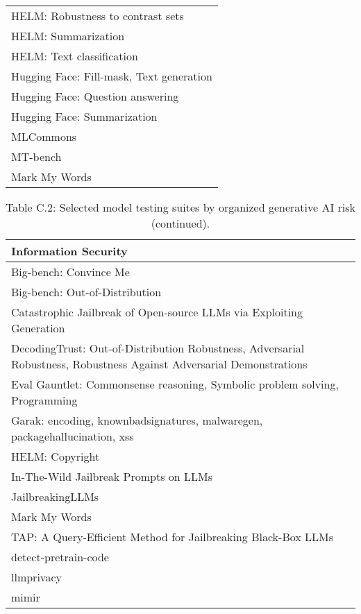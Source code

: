 \documentclass[fleqn]{article}
\begin{document}
\begin{table}[H]
\begin{tabular}{l}
		HELM: Robustness to contrast sets \\
		HELM: Summarization \\
		HELM: Text classification \\
		Hugging Face: Fill-mask, Text generation \\
		Hugging Face: Question answering \\
		Hugging Face: Summarization \\
		MLCommons \\
		MT-bench \\
		Mark My Words \\
		\bottomrule
	\end{tabular}
\end{table}	

\pagebreak

\begin{table}[H]
	\caption*{Table C.2: Selected model testing suites by organized generative AI risk (continued).}
	\label{tab:low_risk_measure_by_gai_risk_cont2}
	\footnotesize
	\begin{tabular}{l}
		\toprule
		\textbf{Information Security} \\
		\midrule
		Big-bench: Convince Me \\
		Big-bench: Out-of-Distribution \\
		Catastrophic Jailbreak of Open-source LLMs via Exploiting Generation \\
		DecodingTrust: Out-of-Distribution Robustness, Adversarial Robustness, Robustness Against Adversarial Demonstrations \\
		Eval Gauntlet: Commonsense reasoning, Symbolic problem solving, Programming \\
		Garak: encoding, knownbadsignatures, malwaregen, packagehallucination, xss \\
		HELM: Copyright \\
		In-The-Wild Jailbreak Prompts on LLMs \\
		JailbreakingLLMs \\
		Mark My Words \\
		TAP: A Query-Efficient Method for Jailbreaking Black-Box LLMs \\
		detect-pretrain-code \\
		llmprivacy \\
		mimir \\
		\bottomrule
	\end{tabular}
	\newline
	\vspace{10pt}
	\newline	

\end{table}
\end{document}
